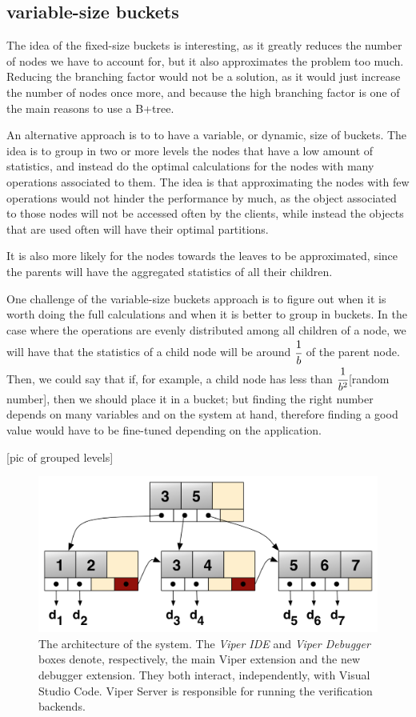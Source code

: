 \subsection{variable-size buckets}\label{sec:variable-size buckets}
The idea of the fixed-size buckets is interesting, as it greatly reduces the number of nodes we have to account for, but it also approximates the problem too much. Reducing the branching factor would not be a solution, as it would just increase the number of nodes once more, and because the high branching factor is one of the main reasons to use a B+tree. 

An alternative approach is to to have a variable, or dynamic, size of buckets. The idea is to group in two or more levels the nodes that have a low amount of statistics, and instead do the optimal calculations for the nodes with many operations associated to them. The idea is that approximating the nodes with few operations would not hinder the performance by much, as the object associated to those nodes will not be accessed often by the clients, while instead the objects that are used often will have their optimal partitions.

It is also more likely for the nodes towards the leaves to be approximated, since the parents will have the aggregated statistics of all their children.

One challenge of the variable-size buckets approach is to figure out when it is worth doing the full calculations and when it is better to group in buckets. In the case where the operations are evenly distributed among all children of a node, we will have that the statistics of a child node will be around $\cfrac{1}{b}$ of the parent node. Then, we could say that if, for example, a child node has less than $\cfrac{1}{b^2}$[random number], then we should place it in a bucket; but finding the right number depends on many variables and on the system at hand, therefore finding a good value would have to be fine-tuned depending on the application.

[pic of grouped levels]
\begin{figure}[htb]
  \centering
  \includegraphics[width=\textwidth,height=\textheight,keepaspectratio]{img/b+tree.png}
  \caption[The architecture of the system]{ The architecture of the system. The
    \textit{Viper IDE} and \textit{Viper Debugger} boxes denote, respectively,
    the main Viper extension and the new debugger extension. They both interact,
    independently, with Visual Studio Code. Viper Server is responsible for
    running the verification backends.}
  \label{fig:b+tree}
\end{figure}

